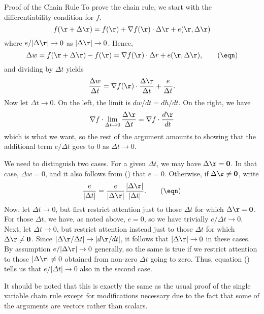 \subhead Proof of the Chain Rule \endsubhead
\demo{}
To prove the chain rule, we start with the differentiability
condition for $f$.
$$
f(\r + \Delta\r) = f(\r) + \nabla f(\r)\cdot\Delta\r
 + e(\r,\Delta \r)
$$
where $e/|\Delta\r| \to 0$ as $|\Delta\r| \to 0$.  
Hence,
\nexteqn
\xdef\ZZZ{\eqn}
$$
\Delta w =
  f(\r + \Delta\r) - f(\r) = \nabla f(\r)\cdot\Delta r
 + e(\r,\Delta \r), \tag\eqn
$$
and dividing by $\Delta t$ yields
$$
 \frac{\Delta w}{\Delta t} 
   = \nabla f(\r)\cdot \frac{\Delta\r}{\Delta t}
        + \frac e{\Delta t}.
$$
Now let $\Delta t \to 0$.  On the left, the limit is $dw/dt = dh/dt$.
On the right, we have
$$
 \nabla f\cdot \lim_{\Delta t\to 0}\frac{\Delta\r}{\Delta t} 
= \nabla f\cdot \frac{d\r}{dt}
$$
which is what we want,
so the rest of the argument amounts to showing that the
additional term $e/\Delta t$ goes to 0 as $\Delta t \to 0$. 

 We need to distinguish
two cases.  For a given $\Delta t$, we may have $\Delta \r = \bold 0$.
In that case, $\Delta w = 0$, and it also follows from
(\ZZZ) that $e = 0$.
Otherwise, if $\Delta \r \not= \bold 0$,  write
\nexteqn
\xdef\YYY{\eqn}
$$
 \frac e{|\Delta t|} = \frac e{|\Delta\r|}\frac{|\Delta\r|}{|\Delta t|}.
\tag\eqn
$$
Now, let $\Delta t \to 0$, but first restrict attention just to those
$\Delta t$ for which $\Delta \r = \bold 0$.   For those
$\Delta t$, we have, as noted above,  $e = 0$, so we have
trivially  $e/\Delta t \to 0$.
Next, let $\Delta t \to 0$, but restrict attention  instead just to
those $\Delta t$ for which $\Delta \r \not = \bold 0$.
Since  $|\Delta\r/\Delta t| \to |d\r/dt|$, it follows
that $|\Delta\r| \to
0$ in these cases. 
By assumption
$e/|\Delta\r| \to 0$ generally, so the same is true if we
restrict attention to those $|\Delta\r| \ne 0$ obtained
from  non-zero $\Delta t$ going to zero.
Thus, equation (\YYY) tells us that $e/|\Delta t|
\to 0$ also in the second case.

It should be noted that this is exactly the same as the usual proof of
the single variable chain rule except for modifications necessary due
to the fact that some of the arguments are vectors rather than
scalars. 
\enddemo

